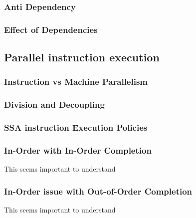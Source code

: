 \subsubsection{Anti Dependency}
\subsubsection{Effect of Dependencies}
\subsection{Parallel instruction execution}
\subsubsection{Instruction vs Machine Parallelism}
\subsubsection{Division and Decoupling}
\subsubsection{SSA instruction Execution Policies}
\subsubsection{In-Order with In-Order Completion}
This seems important to understand
\subsubsection{In-Order issue with Out-of-Order Completion}
This seems important to understand

